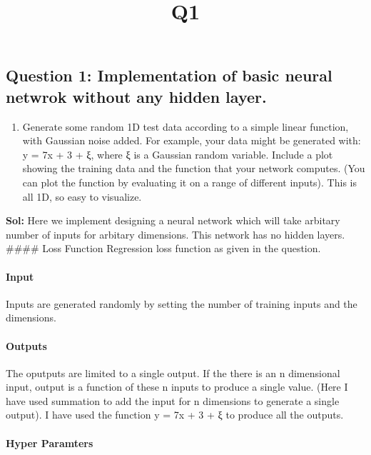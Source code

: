 \documentclass[11pt]{article}
\title{Q1}
\providecommand{\tightlist}{%
      \setlength{\itemsep}{0pt}\setlength{\parskip}{0pt}}
\begin{document}
    
    
    \maketitle
    
    

    
    \subsection{Question 1: Implementation of basic neural netwrok without
any hidden
layer.}\label{question-1-implementation-of-basic-neural-netwrok-without-any-hidden-layer.}

\begin{enumerate}
\def\labelenumi{(\alph{enumi})}
\tightlist
\item
  Generate some random 1D test data according to a simple linear
  function, with Gaussian noise added. For example, your data might be
  generated with: y = 7x + 3 + ξ, where ξ is a Gaussian random variable.
  Include a plot showing the training data and the function that your
  network computes. (You can plot the function by evaluating it on a
  range of different inputs). This is all 1D, so easy to visualize.
\end{enumerate}

    \textbf{Sol:} Here we implement designing a neural network which will
take arbitary number of inputs for arbitary dimensions. This network has
no hidden layers. \#\#\#\# Loss Function Regression loss function as
given in the question.

\paragraph{Input}\label{input}

Inputs are generated randomly by setting the number of training inputs
and the dimensions.

\paragraph{Outputs}\label{outputs}

The oputputs are limited to a single output. If the there is an n
dimensional input, output is a function of these n inputs to produce a
single value. (Here I have used summation to add the input for n
dimensions to generate a single output). I have used the function y = 7x
+ 3 + ξ to produce all the outputs.

\paragraph{Hyper Paramters}\label{hyper-paramters}
\end{document}
